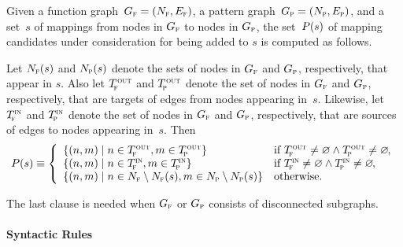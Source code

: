 Given a \gls{function graph}~\mbox{$\fG = \mPair{\fN}{\fE}$}, a \gls{pattern
  graph}~\mbox{$\pG = \mPair{\pN}{\pE}$}, and a set~$s$ of mappings from
\glspl{node} in $G_{\textrm{\textsc{f}}}$ to \glspl{node} in $G_{\textrm{\textsc{p}}}$, the set~$P(s)$ of mapping
candidates under consideration for being added to $s$ is computed as follows.
%
\begin{definition}
  Let $N_{\textrm{\textsc{f}}}(s)$ and $N_{\textrm{\textsc{p}}}(s)$ denote the sets of \glspl{node} in $G_{\textrm{\textsc{f}}}$ and $G_{\textrm{\textsc{p}}}$,
  respectively, that appear in $s$.
  Also let $T_{\!\textrm{\textsc{f}}}^{\hspace{.5pt}\textrm{\textsc{out}}}$ and $T_{\!\textrm{\textsc{p}}}^{\hspace{.5pt}\textrm{\textsc{out}}}$ denote the set of \glspl{node} in $G_{\textrm{\textsc{f}}}$ and
  $G_{\textrm{\textsc{p}}}$, respectively, that are targets of \glspl{edge} from \glspl{node}
  appearing in~$s$.
  Likewise, let $T_{\!\textrm{\textsc{f}}}^{\textrm{\textsc{in}}}$ and $T_{\!\textrm{\textsc{p}}}^{\textrm{\textsc{in}}}$ denote the set of \glspl{node} in $G_{\textrm{\textsc{f}}}$ and
  $G_{\textrm{\textsc{p}}}$, respectively, that are sources of \glspl{edge} to \glspl{node}
  appearing in~$s$.
  Then
  \begin{displaymath}
    \mCandSet \equiv
    \left\{
    \begin{array}{ll}
        \mSetBuilder{\mPair{n}{m}}{n \in \fTout, m \in \pTout}
      & \text{if} \ \fTout \neq \emptyset \mAnd \pTout \neq \emptyset
        \hspace{-1pt}, \\
        \mSetBuilder{\mPair{n}{m}}{n \in \fTin, m \in \pTin}
      & \text{if} \ \fTin \neq \emptyset \mAnd \pTin \neq \emptyset
        \hspace{-1pt}, \\
        \mSetBuilder{\mPair{n}{m}}{
                                    n \in \fN \setminus \fN(s),
                                    m \in \pN \setminus \pN(s)
                                  }
      & \text{otherwise}.
    \end{array}
    \right.
  \end{displaymath}%
\end{definition}
%
The last clause is needed when $G_{\textrm{\textsc{f}}}$ or $G_{\textrm{\textsc{p}}}$ consists of disconnected
\glspl{subgraph}.


\paragraph{Syntactic Rules}

\def\mSynPredRule{R_{\mathsc{pred}}}
\def\mSynSuccRule{R_{\mathsc{succ}}}
\def\mSynInRule{R_{\mathsc{in}}}
\def\mSynOutRule{R_{\mathsc{out}}}
\def\mSynNewRule{R_\mathsc{new}}

